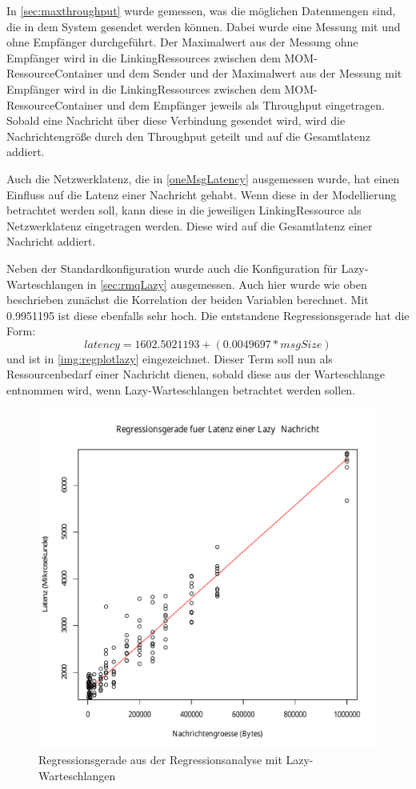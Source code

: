 \par

In \autoref{sec:maxthroughput} wurde gemessen, was die möglichen Datenmengen sind, die in dem System gesendet werden können. Dabei wurde eine Messung mit und ohne Empfänger durchgeführt. Der Maximalwert aus der Messung ohne Empfänger wird in die LinkingRessources zwischen dem MOM-RessourceContainer und dem Sender und der Maximalwert aus der Messung mit Empfänger wird in die LinkingRessources zwischen dem MOM-RessourceContainer und dem Empfänger jeweils als Throughput eingetragen. Sobald eine Nachricht über diese Verbindung gesendet wird, wird die Nachrichtengröße durch den Throughput geteilt und auf die Gesamtlatenz addiert. \par

Auch die Netzwerklatenz, die in \autoref{oneMsgLatency} ausgemessen wurde, hat einen Einfluss auf die Latenz einer Nachricht gehabt. Wenn diese in der Modellierung betrachtet werden soll, kann diese in die jeweiligen LinkingRessource als Netzwerklatenz eingetragen werden. Diese wird auf die Gesamtlatenz einer Nachricht addiert. \par

Neben der Standardkonfiguration wurde auch die Konfiguration für Lazy-Warteschlangen in \autoref{sec:rmqLazy} ausgemessen. Auch hier wurde wie oben beschrieben zunächst die Korrelation der beiden Variablen berechnet. Mit 0.9951195 ist diese ebenfalls sehr hoch. Die entstandene Regressionsgerade hat die Form: \[latency = 1602.5021193 + (0.0049697 * msgSize)\] und ist in \autoref{img:regplotlazy} eingezeichnet. Dieser Term soll nun als Ressourcenbedarf einer Nachricht dienen, sobald diese aus der Warteschlange entnommen wird, wenn Lazy-Warteschlangen betrachtet werden sollen.
\begin{figure}
\center
  \includegraphics[width=1\textwidth]{images/modelling/oneMsgLazyRegression.pdf}
  \caption{Regressionsgerade aus der Regressionsanalyse mit Lazy-Warteschlangen}
  \label{img:regplotlazy}
\end{figure}


